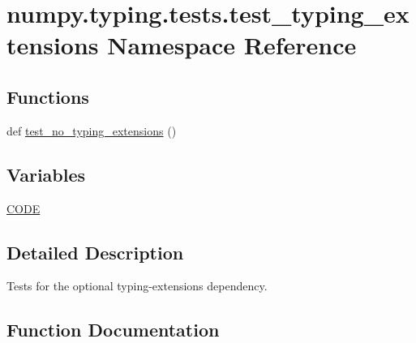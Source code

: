 \hypertarget{namespacenumpy_1_1typing_1_1tests_1_1test__typing__extensions}{}\section{numpy.\+typing.\+tests.\+test\+\_\+typing\+\_\+extensions Namespace Reference}
\label{namespacenumpy_1_1typing_1_1tests_1_1test__typing__extensions}
\subsection*{Functions}
\begin{DoxyCompactItemize}
\item 
def \hyperlink{namespacenumpy_1_1typing_1_1tests_1_1test__typing__extensions_af415e4a70df38ea4ffd16f85141e3850}{test\+\_\+no\+\_\+typing\+\_\+extensions} ()
\end{DoxyCompactItemize}
\subsection*{Variables}
\begin{DoxyCompactItemize}
\item 
\hyperlink{namespacenumpy_1_1typing_1_1tests_1_1test__typing__extensions_a0b48efb2f4614a2f8f513f2e7088f18b}{C\+O\+DE}
\end{DoxyCompactItemize}


\subsection{Detailed Description}
\begin{DoxyVerb}Tests for the optional typing-extensions dependency.\end{DoxyVerb}
 

\subsection{Function Documentation}
\mbox{\label{namespacenumpy_1_1typing_1_1tests_1_1test__typing__extensions_af415e4a70df38ea4ffd16f85141e3850}} 
